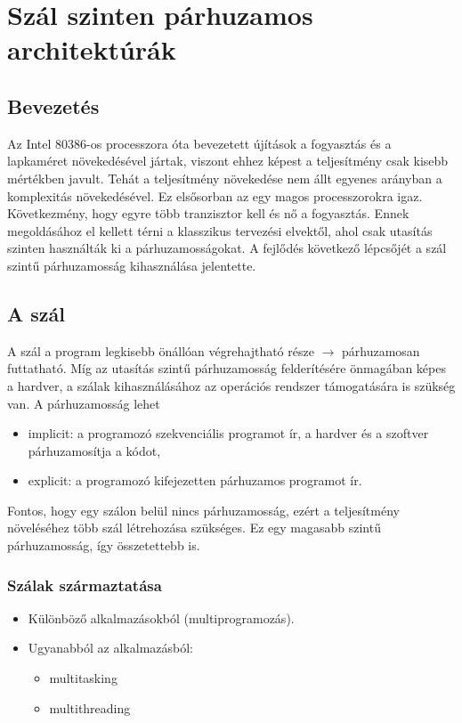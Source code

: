 
\chapter{Szál szinten párhuzamos architektúrák}

\section{Bevezetés}
Az Intel 80386-os processzora óta bevezetett újítások a fogyasztás és a lapkaméret növekedésével jártak, viszont ehhez képest a teljesítmény csak kisebb mértékben javult.
Tehát a teljesítmény növekedése nem állt egyenes arányban a komplexitás növekedésével.
Ez elsősorban az egy magos processzorokra igaz.
Következmény, hogy egyre több tranzisztor kell és nő a fogyasztás.
Ennek megoldásához el kellett térni a klasszikus tervezési elvektől, ahol csak utasítás szinten használták ki a párhuzamosságokat.
A fejlődés következő lépcsőjét a szál szintű párhuzamosság kihasználása jelentette.

\section{A szál}
A szál a program legkisebb önállóan végrehajtható része $\rightarrow$ párhuzamosan futtatható.
Míg az utasítás szintű párhuzamosság felderítésére önmagában képes a hardver, a szálak kihasználásához az operációs rendszer támogatására is szükség van.
A párhuzamosság lehet
\begin{itemize}
    \item implicit: a programozó szekvenciális programot ír, a hardver és a szoftver párhuzamosítja a kódot,
    \item explicit: a programozó kifejezetten párhuzamos programot ír.
\end{itemize}
Fontos, hogy egy szálon belül nincs párhuzamosság, ezért a teljesítmény növeléséhez több szál létrehozása szükséges.
Ez egy magasabb szintű párhuzamosság, így összetettebb is.

\subsection{Szálak származtatása}
\begin{itemize}
    \item Különböző alkalmazásokból (multiprogramozás).
    \item Ugyanabból az alkalmazásból:
    \begin{itemize}
        \item multitasking
        \item multithreading
    \end{itemize}
\end{itemize}

